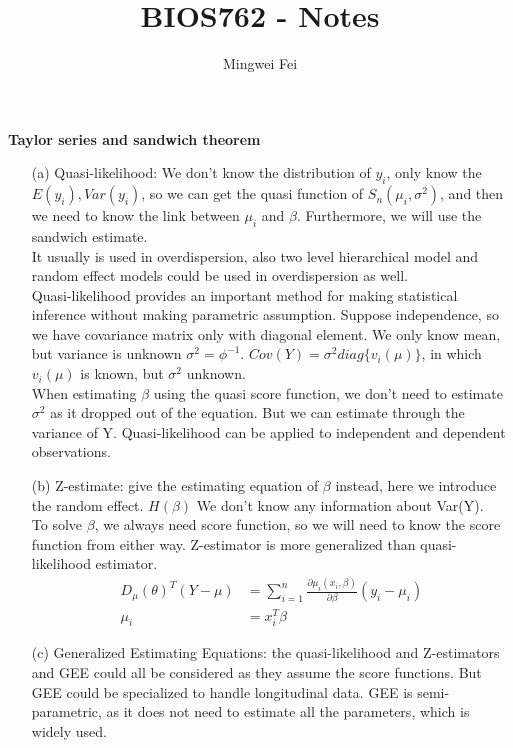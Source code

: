 \documentclass{article}
\title{BIOS762 - Notes}
\author{Mingwei Fei}
\begin{document}
\maketitle


 \textbf{Taylor series and sandwich theorem}
 \begin{itemize}
     \item [(a)] Quasi-likelihood: We don't know the distribution of $y_i$, only know the $E(y_i), Var(y_i)$, so we can get the quasi function of $S_n(\mu_i, \sigma^2)$, and then we need to know the link between $\mu_i$ and $\beta$. Furthermore, we will use the sandwich estimate.\\
     It usually is used in overdispersion, also two level hierarchical model and random effect models could be used in overdispersion as well.\\
     Quasi-likelihood provides an important method for making statistical inference without making parametric assumption. Suppose independence, so we have covariance matrix only with diagonal element. We only know mean, but variance is unknown $\sigma^2 = \phi^{-1}$. $Cov(Y) =  \sigma^2 diag\{v_i(\mu)\}$, in which $v_i(\mu)$ is known, but $\sigma^2$ unknown.\\
     When estimating $\beta$ using the quasi score function, we don't need to estimate $\sigma^2$ as it dropped out of the equation. But we can estimate through the variance of Y. 
Quasi-likelihood can be applied to independent and dependent observations.\\
     
     \item[(b)]  Z-estimate: give the estimating equation of $\beta$ instead, here we introduce the random effect. $H(\beta)$ We don't know any information about Var(Y).\\
 To solve $\beta$, we always need score function, so we will need to know the score function from either way. Z-estimator is more generalized than quasi-likelihood estimator. \\
 \begin{align}
    D_{\mu}(\theta)^T (Y-\mu) &= \sum_{i=1}^n \frac{\partial \mu_i(x_i, \beta)}{\partial \beta} (y_i-\mu_i)\\
    \mu_i &= x_i^T \beta
\end{align}
 \item[(c)] Generalized Estimating Equations: the quasi-likelihood and Z-estimators and GEE could all be considered as they assume the score functions. But GEE could be specialized to handle longitudinal data. GEE is semi-parametric, as it does not need to estimate all the parameters, which is widely used. \\
 \end{itemize}
\end{document}
